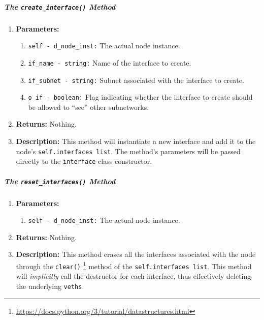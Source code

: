         \subparagraph{The \texttt{create\_interface()} Method}
            \begin{enumerate}
                \item \textbf{Parameters:}
                \begin{enumerate}
                    \item \texttt{self - d\_node\_inst:} The actual node instance.
                    \item \texttt{if\_name - string:} Name of the interface to create.
                    \item \texttt{if\_subnet - string:} Subnet associated with the interface to create.
                    \item \texttt{o\_if - boolean:} Flag indicating whether the interface to create should be allowed to ``see'' other subnetworks.
                \end{enumerate}
                \item \textbf{Returns:} Nothing.
                \item \textbf{Description:} This method will instantiate a new interface and add it to the node's \texttt{self.interfaces list}. The method's parameters will be passed directly to the \texttt{interface} class constructor.
            \end{enumerate}

        \subparagraph{The \texttt{reset\_interfaces()} Method}
            \begin{enumerate}
                \item \textbf{Parameters:}
                \begin{enumerate}
                    \item \texttt{self - d\_node\_inst:} The actual node instance.
                \end{enumerate}
                \item \textbf{Returns:} Nothing.
                \item \textbf{Description:} This method erases all the interfaces associated with the node through the \texttt{clear()} \footnote{\href{https://docs.python.org/3/tutorial/datastructures.html}{https://docs.python.org/3/tutorial/datastructures.html}} method of the \texttt{self.interfaces list}. This method will \textit{implicitly} call the destructor for each interface, thus effectively deleting the underlying \texttt{veths}.
            \end{enumerate}


